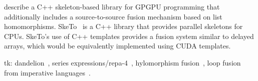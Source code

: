 \citet{Sato:2009cq} describe a C++ skeleton-based library for GPGPU programming
that additionally includes a source-to-source fusion mechanism based on list
homomorphisms. SkeTo~\cite{Matsuzaki:2011ew} is a C++ library that provides
parallel skeletons for CPUs. SkeTo's use of C++ templates provides a fusion
system similar to delayed arrays, which would be equivalently implemented using
CUDA templates.


tk: dandelion~\cite{Rossbach:2013bj}, series
expressions/repa-4~\cite{Lippmeier:2013vz}, hylomorphism
fusion~\cite{Takano:1995}, loop fusion from imperative
languages~\cite{Warren:1984ka,Sarkar:1991ff}.


%
%
%
%
%
%
